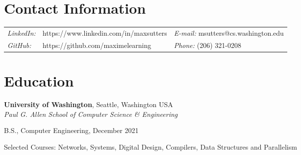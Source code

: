 \documentclass[margin,line]{res}
\newenvironment{list1}{
  \begin{list}{\ding{113}}{%
      \setlength{\itemsep}{0in}
      \setlength{\parsep}{0in} \setlength{\parskip}{0in}
      \setlength{\topsep}{0in} \setlength{\partopsep}{0in} 
      \setlength{\leftmargin}{0.17in}}}{\end{list}}
\begin{document}
\thispagestyle{empty}


\begin{resume}
\section{\sc Contact Information}
\vspace{.05in}
\begin{tabular}{@{}p{0.5in}p{2.5in}p{3in}}
{\it LinkedIn:} & https://www.linkedin.com/in/maxsutters & {\it E-mail:}  msutters@cs.washington.edu \\   
{\it GitHub:} & https://github.com/maximelearning & {\it Phone:} (206) 321-0208
\\   
\end{tabular}


\section{\sc Education}

{\bf University of Washington}, Seattle, Washington USA\\
{\em Paul G. Allen School of Computer Science \& Engineering} 
\vspace*{.1cm} 
\begin{list1}
\item[] B.S., Computer Engineering, December 2021
\item[] Selected Courses: Networks, Systems, Digital Design, Compilers, Data Structures and Parallelism
\end{list1}


\end{resume}
\end{document}
